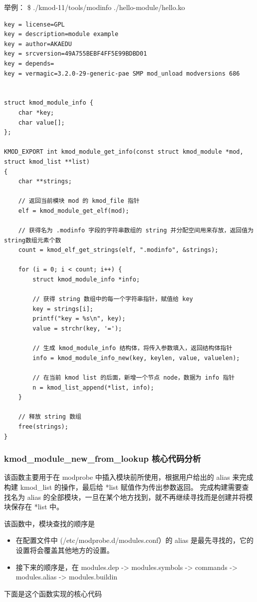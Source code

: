 \documentclass[11pt,a4paper]{article}
\begin{document}
举例： \$ ./kmod-11/tools/modinfo ./hello-module/hello.ko

{\begin{shaded}\begin{verbatim}
key = license=GPL
key = description=module example 
key = author=AKAEDU
key = srcversion=49A755BEBF4FF5E99BDBD01
key = depends=
key = vermagic=3.2.0-29-generic-pae SMP mod_unload modversions 686 


struct kmod_module_info {
    char *key;
    char value[];
};

KMOD_EXPORT int kmod_module_get_info(const struct kmod_module *mod, struct kmod_list **list)
{
    char **strings;

    // 返回当前模块 mod 的 kmod_file 指针
    elf = kmod_module_get_elf(mod);

    // 获得名为 .modinfo 字段的字符串数组的 string 并分配空间用来存放，返回值为string数组元素个数
    count = kmod_elf_get_strings(elf, ".modinfo", &strings);

    for (i = 0; i < count; i++) {
        struct kmod_module_info *info;

        // 获得 string 数组中的每一个字符串指针，赋值给 key
        key = strings[i];
        printf("key = %s\n", key);
        value = strchr(key, '=');

        // 生成 kmod_module_info 结构体，将传入参数填入，返回结构体指针
        info = kmod_module_info_new(key, keylen, value, valuelen);

        // 在当前 kmod list 的后面，新增一个节点 node，数据为 info 指针
        n = kmod_list_append(*list, info);  
    }

    // 释放 string 数组
    free(strings);
}
\end{verbatim}\end{shaded}}
\subsubsection{kmod\_module\_new\_from\_lookup 核心代码分析}

该函数主要用于在 modprobe 中插入模块前所使用，根据用户给出的 alias
来完成构建 kmod\_list 的操作，最后给 *list 赋值作为传出参数返回。
完成构建需要查找名为 alias
的全部模块，一旦在某个地方找到，就不再继续寻找而是创建并将模块保存在 *list
中。

该函数中，模块查找的顺序是

\begin{itemize}
\item
  在配置文件中 (/etc/modprobe.d/modules.conf）的 alias
  是最先寻找的，它的设置将会覆盖其他地方的设置。
\item
  接下来的顺序是，在 modules.dep -\textgreater{} modules.symbols
  -\textgreater{} commands -\textgreater{} modules.alias -\textgreater{}
  modules.buildin
\end{itemize}
下面是这个函数实现的核心代码
\end{document}
